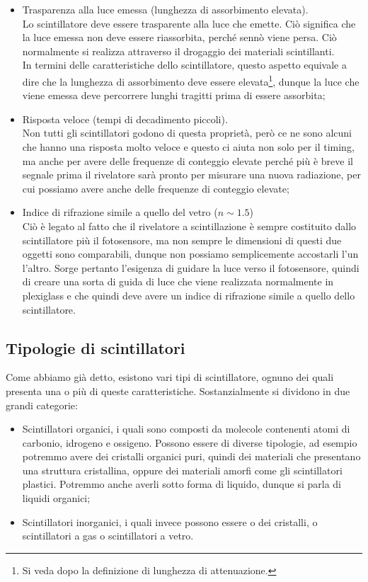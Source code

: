 \begin{itemize}[leftmargin=0.5cm]
   \item Trasparenza alla luce emessa (lunghezza di assorbimento elevata).\\
   Lo scintillatore deve essere trasparente alla luce che emette. Ciò significa che la luce emessa non deve essere riassorbita, perché sennò viene persa. Ciò normalmente si realizza attraverso il drogaggio dei materiali scintillanti.\\
   In termini delle caratteristiche dello scintillatore, questo aspetto equivale a dire che la lunghezza di assorbimento deve essere elevata\footnote{Si veda dopo la definizione di lunghezza di attenuazione.}, dunque la luce che viene emessa deve percorrere lunghi tragitti prima di essere assorbita;
   \item Risposta veloce (tempi di decadimento piccoli).\\
   Non tutti gli scintillatori godono di questa proprietà, però ce ne sono alcuni che hanno una risposta molto veloce e questo ci aiuta non solo per il timing, ma anche per avere delle frequenze di conteggio elevate perché più è breve il segnale prima il rivelatore sarà pronto per misurare una nuova radiazione, per cui possiamo avere anche delle frequenze di conteggio elevate;
   \item Indice di rifrazione simile a quello del vetro ($n \sim 1.5$)\\
   Ciò è legato al fatto che il rivelatore a scintillazione è sempre costituito dallo scintillatore più il fotosensore, ma non sempre le dimensioni di questi due oggetti sono comparabili, dunque non possiamo semplicemente accostarli l'un l'altro. Sorge pertanto l'esigenza di guidare la luce verso il fotosensore, quindi di creare una sorta di guida di luce che viene realizzata normalmente in plexiglass e che quindi deve avere un indice di rifrazione simile a quello dello scintillatore.
\end{itemize}

\subsection{Tipologie di scintillatori}

Come abbiamo già detto, esistono vari tipi di scintillatore, ognuno dei quali presenta una o più di queste caratteristiche. Sostanzialmente si dividono in due grandi categorie:
\begin{itemize}[leftmargin=0.5cm]
   \item Scintillatori organici, i quali sono composti da molecole contenenti atomi di carbonio, idrogeno e ossigeno. Possono essere di diverse tipologie, ad esempio potremmo avere dei cristalli organici puri, quindi dei materiali che presentano una struttura cristallina, oppure dei materiali amorfi come gli scintillatori plastici. Potremmo anche averli sotto forma di liquido, dunque si parla di liquidi organici;
   \item Scintillatori inorganici, i quali invece possono essere o dei cristalli, o scintillatori a gas o scintillatori a vetro.
\end{itemize}

